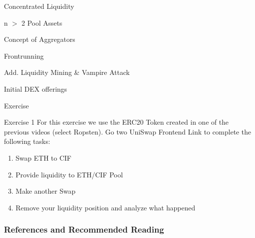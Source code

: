 \documentclass[]{beamer}
\begin{document}
\begin{frame}{Concentrated Liquidity}

\end{frame}


\begin{frame}{n $>$ 2 Pool Assets}

\end{frame}


\begin{frame}{Concept of Aggregators}

\end{frame}


\begin{frame}{Frontrunning}

\end{frame}


\begin{frame}{Add. Liquidity Mining \& Vampire Attack}

\end{frame}


\begin{frame}{Initial DEX offerings}

\end{frame}


\begin{frame}{Exercise}
	\begin{exercise}{Exercise 1}
	For this exercise we use the ERC20 Token created in one of the previous videos (select Ropsten). Go two UniSwap Frontend Link to complete the following tasks:
	
		\begin{enumerate}
			\item Swap ETH to CIF
			\item Provide liquidity to ETH/CIF Pool
			\item Make another Swap
			\item Remove your liquidity position and analyze what happened
		\end{enumerate}
	\end{exercise}
\end{frame}



\begin{frame}%
\frametitle{References and Recommended Reading}
	
	
\end{frame}
\end{document}
